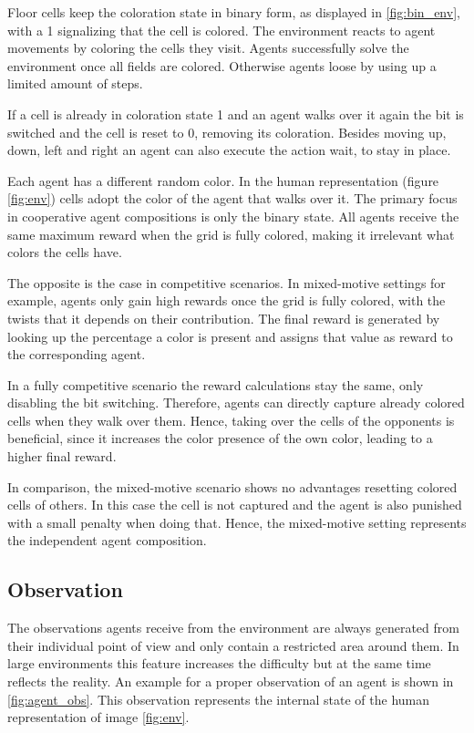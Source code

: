 Floor cells keep the coloration state in binary form, as displayed in \ref{fig:bin_env}, with a 1 signalizing that the cell is colored. The environment reacts to agent movements by coloring the cells they visit. Agents successfully solve the environment once all fields are colored. Otherwise agents loose by using up a limited amount of steps.

If a cell is already in coloration state 1 and an agent walks over it again the bit is switched and the cell is reset to 0, removing its coloration. Besides moving up, down, left and right an agent can also execute the action wait, to stay in place.

Each agent has a different random color. In the human representation (figure \ref{fig:env}) cells adopt the color of the agent that walks over it. The primary focus in cooperative agent compositions is only the binary state. All agents receive the same maximum reward when the grid is fully colored, making it irrelevant what colors the cells have.

The opposite is the case in competitive scenarios. In mixed-motive settings for example, agents only gain high rewards once the grid is fully colored, with the twists that it depends on their contribution. The final reward is generated by looking up the percentage a color is present and assigns that value as reward to the corresponding agent.

In a fully competitive scenario the reward calculations stay the same, only disabling the bit switching. Therefore, agents can directly capture already colored cells when they walk over them. Hence, taking over the cells of the opponents is beneficial, since it increases the color presence of the own color, leading to a higher final reward.

In comparison, the mixed-motive scenario shows no advantages resetting colored cells of others. In this case the cell is not captured and the agent is also punished with a small penalty when doing that. Hence, the mixed-motive setting represents the independent agent composition.

\subsection{Observation}
The observations agents receive from the environment are always generated from their individual point of view and only contain a restricted area around them. In large environments this feature increases the difficulty but at the same time reflects the reality. An example for a proper observation of an agent is shown in \ref{fig:agent_obs}. This observation represents the internal state of the human representation of image \ref{fig:env}.

